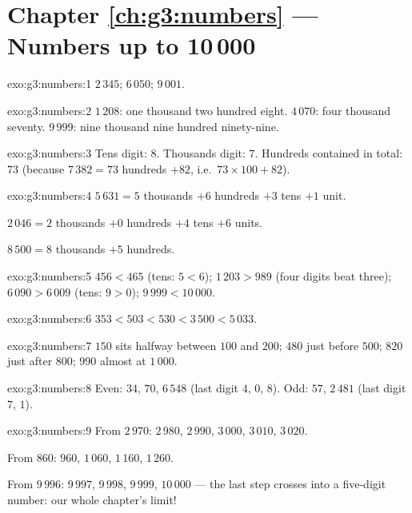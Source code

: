\section*{Chapter \ref{ch:g3:numbers} --- Numbers up to 10\,000}

\begin{solution}{exo:g3:numbers:1}
$2\,345$; \quad $6\,050$; \quad $9\,001$.
\end{solution}

\begin{solution}{exo:g3:numbers:2}
$1\,208$: one thousand two hundred eight. \quad
$4\,070$: four thousand seventy. \quad
$9\,999$: nine thousand nine hundred ninety-nine.
\end{solution}

\begin{solution}{exo:g3:numbers:3}
Tens digit: $8$. Thousands digit: $7$. Hundreds contained in total:
$73$ (because $7\,382 = 73$ hundreds $+ 82$, i.e.\
$73 \times 100 + 82$).
\end{solution}

\begin{solution}{exo:g3:numbers:4}
$5\,631 = 5$ thousands $+ 6$ hundreds $+ 3$ tens $+ 1$ unit.

$2\,046 = 2$ thousands $+ 0$ hundreds $+ 4$ tens $+ 6$ units.

$8\,500 = 8$ thousands $+ 5$ hundreds.
\end{solution}

\begin{solution}{exo:g3:numbers:5}
$456 < 465$ (tens: $5 < 6$); \quad
$1\,203 > 989$ (four digits beat three); \quad
$6\,090 > 6\,009$ (tens: $9 > 0$); \quad
$9\,999 < 10\,000$.
\end{solution}

\begin{solution}{exo:g3:numbers:6}
$353 < 503 < 530 < 3\,500 < 5\,033$.
\end{solution}

\begin{solution}{exo:g3:numbers:7}
$150$ sits halfway between $100$ and $200$; $480$ just before
$500$; $820$ just after $800$; $990$ almost at $1\,000$.
\end{solution}

\begin{solution}{exo:g3:numbers:8}
Even: $34$, $70$, $6\,548$ (last digit $4$, $0$, $8$). Odd: $57$,
$2\,481$ (last digit $7$, $1$).
\end{solution}

\begin{solution}{exo:g3:numbers:9}
From $2\,970$: $2\,980$, $2\,990$, $3\,000$, $3\,010$, $3\,020$.

From $860$: $960$, $1\,060$, $1\,160$, $1\,260$.

From $9\,996$: $9\,997$, $9\,998$, $9\,999$, $10\,000$ --- the last
step crosses into a five-digit number: our whole chapter's limit!
\end{solution}

